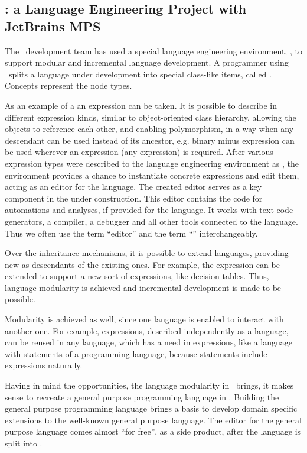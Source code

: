 \subsection{\mbdr: a Language Engineering Project with JetBrains MPS}

The \mbdr\ development team has used a special language engineering environment, , to support modular and incremental 
language development.  A programmer using \jbmps\ splits a language under development into special class-like items, 
called . Concepts represent the  node types. 

As an example of a  an expression can be taken. It is possible to describe in  different 
expression kinds, similar to object-oriented class hierarchy, allowing the objects to reference each other, 
and enabling polymorphism, in a way when any descendant can be used instead of its ancestor, e.g. 
binary minus expression can be used wherever an expression (any expression) is required. 
After various expression types were described to the language engineering environment as , 
the environment provides a chance to instantiate concrete expressions and edit them, acting as an editor for 
the language. The created editor serves as a key component in the  under construction. This editor
contains the code for automations and analyses, if provided for the language. It works with text code generators, 
a compiler, a debugger and all other tools connected to the language. Thus we often use the term ``editor'' and 
the term ``'' interchangeably.

Over the inheritance mechanisms, it is possible to extend languages, providing new  as descendants of 
the existing ones. For example, the expression  can be extended to support a new sort of expressions, like decision tables.
Thus, language modularity is achieved and incremental development is made to be possible.

Modularity is achieved as well, since one language is enabled to interact with another one. For example, expressions,
described independently as a language, can be reused in any language, which has a need in expressions, like a language with
statements of a programming language, because statements include expressions naturally.

Having in mind the opportunities, the language modularity in \jbmps\ brings, it makes sense to recreate a general 
purpose programming language in \jbmps. Building the general purpose programming language brings a basis to develop 
domain specific extensions to the well-known general purpose language. The editor for the general purpose language comes 
almost ``for free'', as a side product, after the language is split into .

